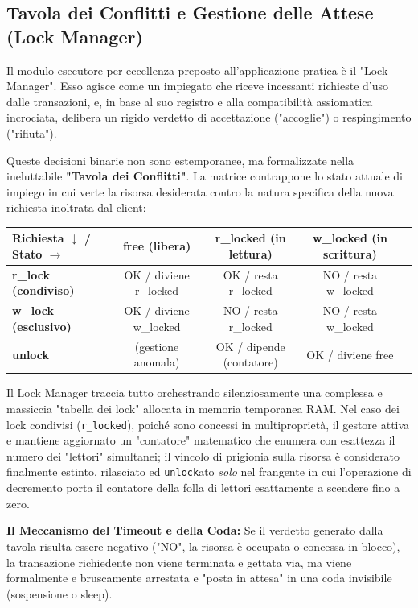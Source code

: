 \subsection{Tavola dei Conflitti e Gestione delle Attese (Lock Manager)}
Il modulo esecutore per eccellenza preposto all'applicazione pratica è il "Lock Manager". Esso agisce come un impiegato che riceve incessanti richieste d'uso dalle transazioni, e, in base al suo registro e alla compatibilità assiomatica incrociata, delibera un rigido verdetto di accettazione ("accoglie") o respingimento ("rifiuta").

Queste decisioni binarie non sono estemporanee, ma formalizzate nella ineluttabile \textbf{"Tavola dei Conflitti"}. La matrice contrappone lo stato attuale di impiego in cui verte la risorsa desiderata contro la natura specifica della nuova richiesta inoltrata dal client:

\begin{center}
\begin{tabular}{|l|c|c|c|c|}
\hline
\textbf{Richiesta $\downarrow$ / Stato $\rightarrow$} & \textbf{free (libera)} & \textbf{r\_locked (in lettura)} & \textbf{w\_locked (in scrittura)} \\
\hline
\textbf{r\_lock (condiviso)} & OK / diviene r\_locked & OK / resta r\_locked & NO / resta w\_locked \\
\hline
\textbf{w\_lock (esclusivo)} & OK / diviene w\_locked & NO / resta r\_locked & NO / resta w\_locked \\
\hline
\textbf{unlock} & (gestione anomala) & OK / dipende (contatore) & OK / diviene free \\
\hline
\end{tabular}
\end{center}

Il Lock Manager traccia tutto orchestrando silenziosamente una complessa e massiccia "tabella dei lock" allocata in memoria temporanea RAM. Nel caso dei lock condivisi (\texttt{r\_locked}), poiché sono concessi in multiproprietà, il gestore attiva e mantiene aggiornato un "contatore" matematico che enumera con esattezza il numero dei "lettori" simultanei; il vincolo di prigionia sulla risorsa è considerato finalmente estinto, rilasciato ed \texttt{unlock}ato \textit{solo} nel frangente in cui l'operazione di decremento porta il contatore della folla di lettori esattamente a scendere fino a zero.

\textbf{Il Meccanismo del Timeout e della Coda:}
Se il verdetto generato dalla tavola risulta essere negativo ("NO", la risorsa è occupata o concessa in blocco), la transazione richiedente non viene terminata e gettata via, ma viene formalmente e bruscamente arrestata e "posta in attesa" in una coda invisibile (sospensione o sleep).

